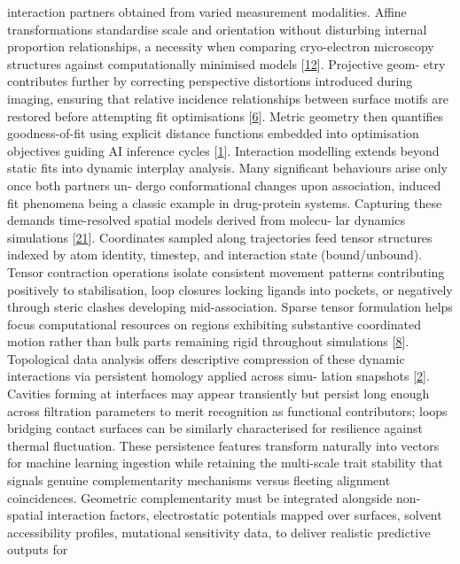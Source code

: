 \documentclass[
]{article}
\begin{document}
interaction partners obtained from varied measurement modalities. Affine
transformations standardise scale and orientation without disturbing
internal proportion relationships, a necessity when comparing
cryo-electron microscopy structures against computationally minimised
models {[}\hyperref[_bookmark52]{12}{]}. Projective geom- etry
contributes further by correcting perspective distortions introduced
during imaging, ensuring that relative incidence relationships between
surface motifs are restored before attempting fit optimisations
{[}\hyperref[_bookmark46]{6}{]}. Metric geometry then quantifies
goodness-of-fit using explicit distance functions embedded into
optimisation objectives guiding AI inference cycles
{[}\hyperref[_bookmark41]{1}{]}. Interaction modelling extends beyond
static fits into dynamic interplay analysis. Many significant behaviours
arise only once both partners un- dergo conformational changes upon
association, induced fit phenomena being a classic example in
drug-protein systems. Capturing these demands time-resolved spatial
models derived from molecu- lar dynamics simulations
{[}\hyperref[_bookmark61]{21}{]}. Coordinates sampled along trajectories
feed tensor structures indexed by atom identity, timestep, and
interaction state (bound/unbound). Tensor contraction operations isolate
consistent movement patterns contributing positively to stabilisation,
loop closures locking ligands into pockets, or negatively through steric
clashes developing mid-association. Sparse tensor formulation helps
focus computational resources on regions exhibiting substantive
coordinated motion rather than bulk parts remaining rigid throughout
simulations {[}\hyperref[_bookmark48]{8}{]}. Topological data analysis
offers descriptive compression of these dynamic interactions via
persistent homology applied across simu- lation snapshots
{[}\hyperref[_bookmark42]{2}{]}. Cavities forming at interfaces may
appear transiently but persist long enough across filtration parameters
to merit recognition as functional contributors; loops bridging contact
surfaces can be similarly characterised for resilience against thermal
fluctuation. These persistence features transform naturally into vectors
for machine learning ingestion while retaining the multi-scale trait
stability that signals genuine complementarity mechanisms versus
fleeting alignment coincidences. Geometric complementarity must be
integrated alongside non-spatial interaction factors, electrostatic
potentials mapped over surfaces, solvent accessibility profiles,
mutational sensitivity data, to deliver realistic predictive outputs for
\end{document}
